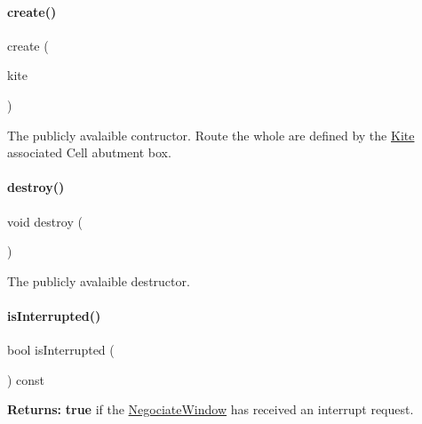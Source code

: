 \paragraph{\texorpdfstring{create()}{create()}}
{\footnotesize\ttfamily create (\begin{DoxyParamCaption}\item[{\hyperlink{classKite_1_1KiteEngine}{Kite\+Engine} $\ast$}]{kite }\end{DoxyParamCaption})\hspace{0.3cm}{\ttfamily [static]}}

The publicly avalaible contructor. Route the whole are defined by the \hyperlink{namespaceKite}{Kite} associated Cell abutment box. \mbox{\label{classKite_1_1NegociateWindow_a3a80b6032f86a56bec74609034b3246f}} 
\paragraph{\texorpdfstring{destroy()}{destroy()}}
{\footnotesize\ttfamily void destroy (\begin{DoxyParamCaption}{ }\end{DoxyParamCaption})}

The publicly avalaible destructor. \mbox{\label{classKite_1_1NegociateWindow_aa1a08014471e19352a5efdabad3a87cb}} 
\paragraph{\texorpdfstring{is\+Interrupted()}{isInterrupted()}}
{\footnotesize\ttfamily bool is\+Interrupted (\begin{DoxyParamCaption}{ }\end{DoxyParamCaption}) const\hspace{0.3cm}{\ttfamily [inline]}}

{\bfseries Returns\+:} {\bfseries true} if the \hyperlink{classKite_1_1NegociateWindow}{Negociate\+Window} has received an interrupt request. \mbox{\label{classKite_1_1NegociateWindow_af7373bd3a4ee8fcf28a316230ed37fc0}} 
